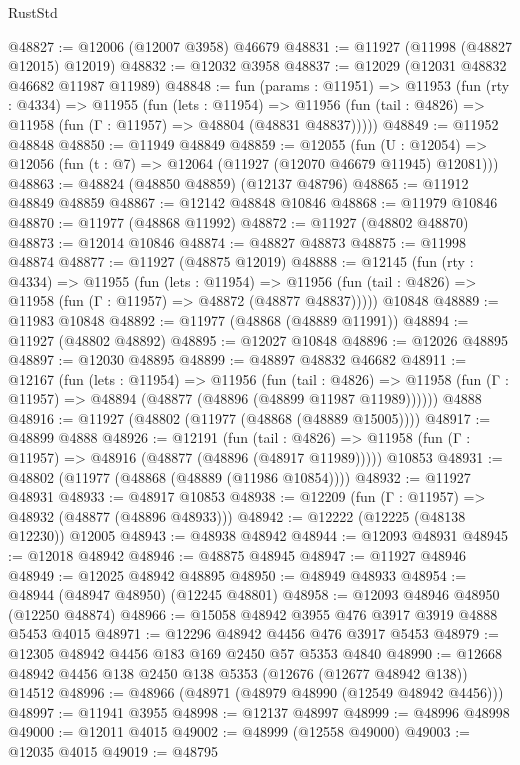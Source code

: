 \begin{lexlean}{RustStd}
\begin{coremodule}
@48827 := @12006 (@12007 @3958) @46679
@48831 := @11927 (@11998 (@48827 @12015) @12019)
@48832 := @12032 @3958
@48837 := @12029 (@12031 @48832 @46682 @11987 @11989)
@48848 := fun (params : @11951) =>
  @11953
    (fun (rty : @4334) =>
    @11955
      (fun (lets : @11954) =>
      @11956 (fun (tail : @4826) => @11958 (fun (Γ : @11957) => @48804 (@48831 @48837)))))
@48849 := @11952 @48848
@48850 := @11949 @48849
@48859 := @12055
    (fun (U : @12054) => @12056 (fun (t : @7) => @12064 (@11927 (@12070 @46679 @11945) @12081)))
@48863 := @48824 (@48850 @48859) (@12137 @48796)
@48865 := @11912 @48849 @48859
@48867 := @12142 @48848 @10846
@48868 := @11979 @10846
@48870 := @11977 (@48868 @11992)
@48872 := @11927 (@48802 @48870)
@48873 := @12014 @10846
@48874 := @48827 @48873
@48875 := @11998 @48874
@48877 := @11927 (@48875 @12019)
@48888 := @12145
    (fun (rty : @4334) =>
    @11955
      (fun (lets : @11954) =>
      @11956 (fun (tail : @4826) => @11958 (fun (Γ : @11957) => @48872 (@48877 @48837)))))
    @10848
@48889 := @11983 @10848
@48892 := @11977 (@48868 (@48889 @11991))
@48894 := @11927 (@48802 @48892)
@48895 := @12027 @10848
@48896 := @12026 @48895
@48897 := @12030 @48895
@48899 := @48897 @48832 @46682
@48911 := @12167
    (fun (lets : @11954) =>
    @11956
      (fun (tail : @4826) =>
      @11958 (fun (Γ : @11957) => @48894 (@48877 (@48896 (@48899 @11987 @11989))))))
    @4888
@48916 := @11927 (@48802 (@11977 (@48868 (@48889 @15005))))
@48917 := @48899 @4888
@48926 := @12191
    (fun (tail : @4826) => @11958 (fun (Γ : @11957) => @48916 (@48877 (@48896 (@48917 @11989)))))
    @10853
@48931 := @48802 (@11977 (@48868 (@48889 (@11986 @10854))))
@48932 := @11927 @48931
@48933 := @48917 @10853
@48938 := @12209 (fun (Γ : @11957) => @48932 (@48877 (@48896 @48933)))
@48942 := @12222 (@12225 (@48138 @12230)) @12005
@48943 := @48938 @48942
@48944 := @12093 @48931
@48945 := @12018 @48942
@48946 := @48875 @48945
@48947 := @11927 @48946
@48949 := @12025 @48942 @48895
@48950 := @48949 @48933
@48954 := @48944 (@48947 @48950) (@12245 @48801)
@48958 := @12093 @48946 @48950 (@12250 @48874)
@48966 := @15058 @48942 @3955 @476 @3917 @3919 @4888 @5453 @4015
@48971 := @12296 @48942 @4456 @476 @3917 @5453
@48979 := @12305 @48942 @4456 @183 @169 @2450 @57 @5353 @4840
@48990 := @12668 @48942 @4456 @138 @2450 @138 @5353 (@12676 (@12677 @48942 @138)) @14512
@48996 := @48966 (@48971 (@48979 @48990 (@12549 @48942 @4456)))
@48997 := @11941 @3955
@48998 := @12137 @48997
@48999 := @48996 @48998
@49000 := @12011 @4015
@49002 := @48999 (@12558 @49000)
@49003 := @12035 @4015
@49019 := @48795

\end{coremodule}
\end{lexlean}
